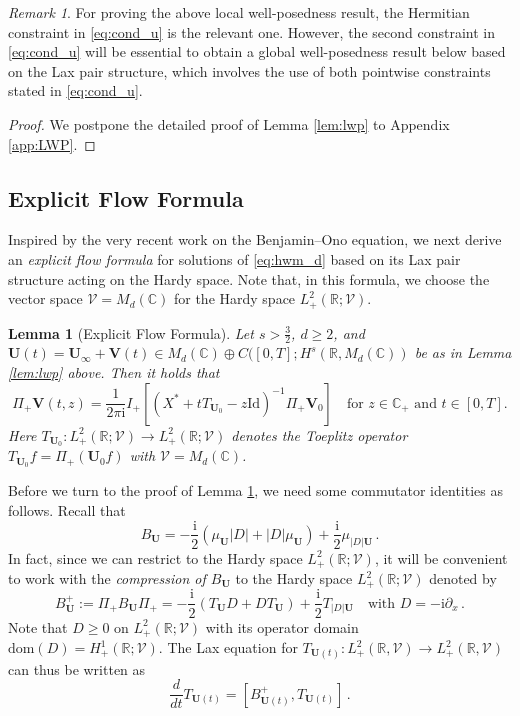 \documentclass[11pt,reqno]{amsart}
\newtheorem{lem}{Lemma}[section]
\theoremstyle{definition}
\theoremstyle{remark}
\theoremstyle{remark}
\newtheorem*{remark*}{Remark}
\numberwithin{equation}{section}
\newcommand{\C}{\mathbb{C}}
\newcommand{\R}{\mathbb{R}}
\newcommand{\VV}{\mathcal{V}}
\newcommand{\dom}{\mathrm{dom}}
\newcommand{\pt}{\partial}
\newcommand{\ii}{\mathrm{i}}
\newcommand{\Vb}{\mathbf{V}}
\newcommand{\Ub}{\mathbf{U}}
\newcommand{\id}{\mathrm{Id}}
\begin{document}
\begin{remark*}
For proving the above local well-posedness result, the Hermitian constraint in \eqref{eq:cond_u} is the relevant one. However, the second constraint in \eqref{eq:cond_u} will be essential to obtain a global well-posedness result below based on the Lax pair structure, which involves the use of both pointwise constraints stated in \eqref{eq:cond_u}. 
\end{remark*}

\begin{proof}
We postpone the detailed proof of Lemma \ref{lem:lwp} to Appendix \ref{app:LWP}. 
\end{proof}

\subsection*{Explicit Flow Formula}
Inspired by the very recent work \cite{Ge-23} on the Benjamin--Ono equation, we next derive an {\em explicit flow formula} for solutions of \eqref{eq:hwm_d} based on its Lax pair structure acting on the Hardy space. Note that, in this formula, we choose the vector space $\VV = M_d(\C)$ for the Hardy space $L^2_+(\R; \VV)$. 


\begin{lem}[Explicit Flow Formula] 
\label{lem:explicit}
Let $s > \frac{3}{2}$, $d \geq 2$, and $\Ub(t) = \Ub_\infty + \Vb(t) \in  M_d(\C) \oplus C([0,T]; H^s(\R, M_d(\C))$ be as in Lemma \ref{lem:lwp} above. Then it holds that
$$
\Pi_+ \Vb(t,z) = \frac{1}{2 \pi \ii} I_+ \left [ (X^*+tT_{\Ub_0} - z \id)^{-1} \Pi_+ \Vb_0 \right ] \quad \mbox{for $z \in \C_+$ and $t \in [0,T]$.} 
$$
Here $T_{\Ub_0} : L^2_+(\R; \VV) \to L^2_+(\R; \VV)$ denotes the Toeplitz operator $T_{\Ub_0} f = \Pi_+(\Ub_0 f)$ with $\VV = M_d(\C)$.
\end{lem}


Before we turn to the proof of Lemma \ref{lem:explicit}, we need some commutator identities as follows. Recall that
$$
B_{\Ub} = -\frac{\ii}{2} ( \mu_{\Ub} |D| + |D| \mu_{\Ub} ) + \frac{\ii}{2} \mu_{|D| \Ub} \, .
$$
In fact, since we can restrict to the Hardy space $L^2_+(\R; \VV)$, it will be convenient to work with  the {\em compression of $B_{\Ub}$} to the Hardy space $L^2_+(\R; \VV)$ denoted by
$$
B^+_{\Ub} := \Pi_+ B_{\Ub} \Pi_+ = -\frac{\ii}{2} (T_{\Ub} D + D T_{\Ub}) + \frac{\ii}{2} T_{|D| \Ub} \quad \mbox{with $D=-\ii \pt_x$} \, .
$$ 
Note that $D \geq 0$ on $L^2_+(\R; \VV)$ with its operator domain $\dom(D) = H^1_+(\R; \VV)$. The Lax equation for $T_{\Ub(t)} : L^2_+(\R, \VV) \to L^2_+(\R, \VV)$ can thus be written as
$$
\frac{d}{dt} T_{\Ub(t)} = [B_{\Ub(t)}^+, T_{\Ub(t)} ] \, .
$$
\end{document}
